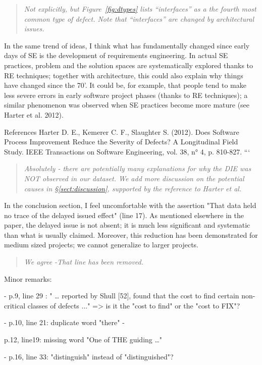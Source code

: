 \documentclass[smallcondensed]{svjour3}
\newcommand{\tion}[1]{\S\ref{sect:#1}}
\newcommand{\fig}[1]{Figure~\ref{fig:#1}}
\begin{document}
\begin{quote}{\em
Not explicitly, but \fig{dtypes} lists ``interfaces'' as a the fourth most
common type of defect. Note that ``interfaces'' are changed by architectural
issues. }\end{quote}
 
In the same trend of ideas, I think what has
fundamentally changed since early days of SE is the
development of requirements engineering. In actual SE
practices, problem and the solution spaces are
systematically explored thanks to RE techniques; together
with architecture, this could also explain why things have
changed since the 70'. It could be, for example, that people
tend to make less severe errors in early software project
phases (thanks to RE techniques); a similar phenomenon was
observed when SE practices become more mature (see Harter et
al. 2012).  

References Harter D. E., Kemerer C. F., Slaughter S. (2012).
Does Software Process Improvement Reduce the Severity of
Defects? A Longitudinal Field Study. IEEE Transactions on
Software Engineering, vol. 38, n° 4, p. 810-827.
```

\begin{quote}{\em
  Absolutely - there are potentially many explanations for why the DIE was NOT observed in our dataset. We add more discussion on the potential causes in \tion{discussion}, supported by the reference to Harter et al.
 }\end{quote}

 
In the conclusion section, I feel uncomfortable with
the assertion "That data held no trace of the delayed issued
effect" (line 17). As mentioned elsewhere in the paper, the
delayed issue is not absent; it is much less significant and
systematic than what is usually claimed. Moreover, this
reduction has been demonstrated for medium sized projects;
we cannot generalize to larger projects.  
\begin{quote}{\em
  We agree -That line has been removed.
 }\end{quote}


Minor remarks: 

- p.9, line 29 : " … reported by Shull [52], found that the cost to find certain non-critical classes of defects ..." => is it the "cost to find" or the "cost to FIX"?  

- p.10, line 21: duplicate word "there" -

p.12, line19: missing word "One of THE guiding …" 

- p.16, line 33: "distinguish" instead of "distinguished"?  
\end{document}
